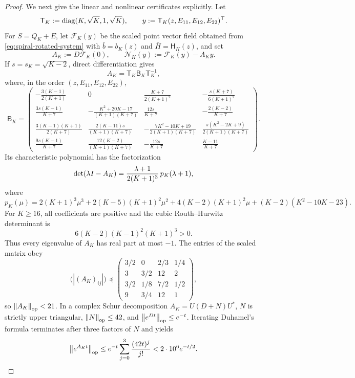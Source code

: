 \begin{proof}
We next give the linear and nonlinear certificates explicitly.  Let
\begin{equation}
\label{eq:spiral-y-scaling}
 \mathsf T_K:=\operatorname{diag}(K,\sqrt K,1,\sqrt K),
 \qquad
 y:=\mathsf T_K(z,E_{11},E_{12},E_{22})^\top.
\end{equation}
For $S=Q_K+E$, let $\mathcal F_K(y)$ be the scaled point vector field obtained from
\eqref{eq:spiral-rotated-system} with $\bar b=b_K(z)$ and $\bar H=\mathsf H_K(z)$, and set
\[
 A_K:=D\mathcal F_K(0),
 \qquad
 \mathcal N_K(y):=\mathcal F_K(y)-A_Ky.
\]
If $s=s_K=\sqrt{K-2}$, direct differentiation gives
\begin{equation}
\label{eq:spiral-linear-matrix}
 A_K=\mathsf T_K\mathsf B_K\mathsf T_K^{-1},
\end{equation}
where, in the order $(z,E_{11},E_{12},E_{22})$,
{\scriptsize
\[
\mathsf B_K=
\begin{pmatrix}
-\frac{3(K-1)}{2(K+1)}&0&\frac{K+7}{2(K+1)^2}&-\frac{s(K+7)}{6(K+1)^2}\\[1mm]
\frac{3s(K-1)}{K+7}&-\frac{K^2+20K-17}{(K+1)(K+7)}&\frac{12s}{K+7}&-\frac{2(K-2)}{K+7}\\[1mm]
\frac{3(K-1)(K+1)}{2(K+7)}&\frac{2(K-11)s}{(K+1)(K+7)}&-\frac{7K^2-10K+19}{2(K+1)(K+7)}&\frac{s(K^2-2K+9)}{2(K+1)(K+7)}\\[1mm]
\frac{9s(K-1)}{K+7}&\frac{12(K-2)}{(K+1)(K+7)}&-\frac{12s}{K+7}&\frac{K-11}{K+7}
\end{pmatrix}.
\]
}
Its characteristic polynomial has the factorization
\begin{equation}
\label{eq:spiral-characteristic}
 \det(\lambda I-A_K)
 =\frac{\lambda+1}{2(K+1)^3}\,p_K(\lambda+1),
\end{equation}
where
\[
 p_K(\mu)
 =2(K+1)^3\mu^3
 +2(K-5)(K+1)^2\mu^2
 +4(K-2)(K+1)^2\mu
 +(K-2)(K^2-10K-23).
\]
For $K\geq16$, all coefficients are positive and the cubic Routh--Hurwitz determinant is
\[
 6(K-2)(K-1)^2(K+1)^3>0.
\]
Thus every eigenvalue of $A_K$ has real part at most $-1$.  The entries of the scaled matrix obey
\[
 \bigl(|(A_K)_{ij}|\bigr)
 \preceq
 \begin{pmatrix}
 3/2&0&2/3&1/4\\
 3&3/2&12&2\\
 3/2&1/8&7/2&1/2\\
 9&3/4&12&1
 \end{pmatrix},
\]
so $\left\lVert A_K\right\rVert_{\mathrm{op}}<21$.  In a complex Schur decomposition $A_K=U(D+N)U^*$,
$N$ is strictly upper triangular, $\left\lVert N\right\rVert_{\mathrm{op}}\leq42$, and
$\left\lVert e^{Dt}\right\rVert_{\mathrm{op}}\leq e^{-t}$.  Iterating Duhamel's formula terminates after three factors of
$N$ and yields
\begin{equation}
\label{eq:spiral-semigroup}
 \left\lVert e^{A_Kt}\right\rVert_{\mathrm{op}}
 \leq e^{-t}\sum_{j=0}^3\frac{(42t)^j}{j!}
 <2\cdot10^6e^{-t/2}.
\end{equation}


\end{proof}
